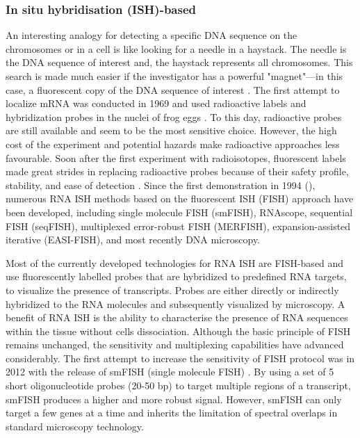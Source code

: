 \subsubsection{In situ hybridisation (ISH)-based}

\label{section:Imaging_sequecing_review}
An interesting analogy for detecting a specific DNA sequence on the chromosomes or in a cell is like looking for a needle in a haystack. The needle is the DNA sequence of interest and, the haystack represents all chromosomes. This search is made much easier if the investigator has a powerful "magnet"—in this case, a fluorescent copy of the DNA sequence of interest \cite{Connor2008natureEdu}. The first attempt to localize mRNA was conducted in 1969 and used radioactive labels and hybridization probes in the nuclei of frog eggs \cite{pardue1969molecular}. To this day, radioactive probes are still available and seem to be the most sensitive choice. However, the high cost of the experiment and potential hazards make radioactive approaches less favourable. Soon after the first experiment with radioisotopes, fluorescent labels made great strides in replacing radioactive probes because of their safety profile, stability, and ease of detection \cite{rudkin1977high, Connor2008natureEdu}. Since the first demonstration in 1994 (\cite{bassell1994single}), numerous RNA ISH methods based on the fluorescent ISH (FISH) approach have been developed, including single molecule FISH (smFISH), RNAscope, sequential FISH (seqFISH), multiplexed error-robust FISH (MERFISH), expansion-assisted iterative (EASI-FISH), and most recently DNA microscopy. 

Most of the currently developed technologies for RNA ISH are FISH-based and use fluorescently labelled probes that are hybridized to predefined RNA targets, to visualize the presence of transcripts. Probes are either directly or indirectly hybridized to the RNA molecules and subsequently visualized by microscopy. A benefit of RNA ISH is the ability to characterise the presence of RNA sequences within the tissue without cells dissociation. Although the basic principle of FISH remains unchanged, the sensitivity and multiplexing capabilities have advanced considerably. The first attempt to increase the sensitivity of FISH protocol was in 2012 with the release of smFISH (single molecule FISH) \cite{ji2012single}. By using a set of 5 short oligonucleotide probes (20-50 bp) to target multiple regions of a transcript, smFISH produces a higher and more robust signal. However, smFISH can only target a few genes at a time and inherits the limitation of spectral overlaps in standard microscopy technology.

